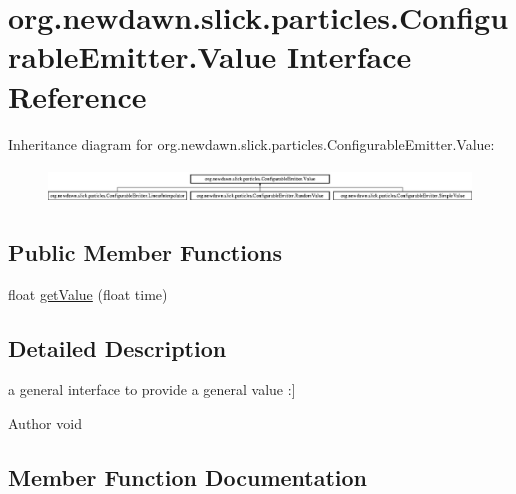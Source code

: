 \hypertarget{interfaceorg_1_1newdawn_1_1slick_1_1particles_1_1_configurable_emitter_1_1_value}{}\section{org.\+newdawn.\+slick.\+particles.\+Configurable\+Emitter.\+Value Interface Reference}
\label{interfaceorg_1_1newdawn_1_1slick_1_1particles_1_1_configurable_emitter_1_1_value}
Inheritance diagram for org.\+newdawn.\+slick.\+particles.\+Configurable\+Emitter.\+Value\+:\begin{figure}[H]
\begin{center}
\leavevmode
\includegraphics[height=0.942761cm]{interfaceorg_1_1newdawn_1_1slick_1_1particles_1_1_configurable_emitter_1_1_value}
\end{center}
\end{figure}
\subsection*{Public Member Functions}
\begin{DoxyCompactItemize}
\item 
float \mbox{\hyperlink{interfaceorg_1_1newdawn_1_1slick_1_1particles_1_1_configurable_emitter_1_1_value_aa5f167090202b78c65e324edd27e277c}{get\+Value}} (float time)
\end{DoxyCompactItemize}


\subsection{Detailed Description}
a general interface to provide a general value \+:\mbox{]}

\begin{DoxyAuthor}{Author}
void 
\end{DoxyAuthor}


\subsection{Member Function Documentation}
\mbox{\label{interfaceorg_1_1newdawn_1_1slick_1_1particles_1_1_configurable_emitter_1_1_value_aa5f167090202b78c65e324edd27e277c}} 
